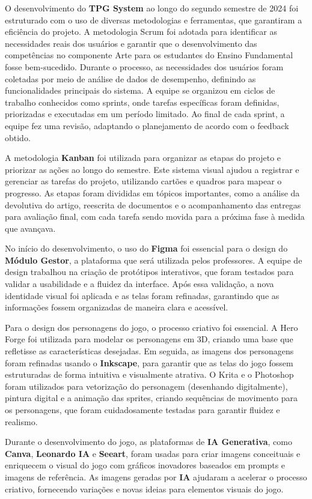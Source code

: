 O desenvolvimento do \textbf{TPG System} ao longo do segundo semestre de 2024 foi estruturado com o uso de diversas metodologias e ferramentas, que garantiram a eficiência do projeto. A metodologia Scrum foi adotada para identificar as necessidades reais dos usuários e garantir que o desenvolvimento das competências no componente Arte para os estudantes do Ensino Fundamental fosse bem-sucedido. Durante o processo, as necessidades dos usuários foram coletadas por meio de análise de dados de desempenho, definindo as funcionalidades principais do sistema. A equipe se organizou em ciclos de trabalho conhecidos como sprints, onde tarefas específicas foram definidas, priorizadas e executadas em um período limitado. Ao final de cada sprint, a equipe fez uma revisão, adaptando o planejamento de acordo com o feedback obtido.

A metodologia \textbf{Kanban} foi utilizada para organizar as etapas do projeto e priorizar as ações ao longo do semestre. Este sistema visual ajudou a registrar e gerenciar as tarefas do projeto, utilizando cartões e quadros para mapear o progresso. As etapas foram divididas em tópicos importantes, como a análise da devolutiva do artigo, reescrita de documentos e o acompanhamento das entregas para avaliação final, com cada tarefa sendo movida para a próxima fase à medida que avançava.

No início do desenvolvimento, o uso do \textbf{Figma} foi essencial para o design do \textbf{Módulo Gestor}, a plataforma que será utilizada pelos professores. A equipe de design trabalhou na criação de protótipos interativos, que foram testados para validar a usabilidade e a fluidez da interface. Após essa validação, a nova identidade visual foi aplicada e as telas foram refinadas, garantindo que as informações fossem organizadas de maneira clara e acessível.

Para o design dos personagens do jogo, o processo criativo foi essencial. A Hero Forge foi utilizada para modelar os personagens em 3D, criando uma base que refletisse as características desejadas. Em seguida, as imagens dos personagens foram refinadas usando o \textbf{Inkscape}, para garantir que as telas do jogo fossem estruturadas de forma intuitiva e visualmente atrativa. O Krita e o Photoshop foram utilizados para vetorização do personagem (desenhando digitalmente), pintura digital e a animação das sprites, criando sequências de movimento para os personagens, que foram cuidadosamente testadas para garantir fluidez e realismo.

Durante o desenvolvimento do jogo, as plataformas de \textbf{IA Generativa}, como \textbf{Canva}, \textbf{Leonardo IA} e \textbf{Seeart}, foram usadas para criar imagens conceituais e enriquecem o visual do jogo com gráficos inovadores baseados em prompts e imagens de referência. As imagens geradas por \textbf{IA} ajudaram a acelerar o processo criativo, fornecendo variações e novas ideias para elementos visuais do jogo.

